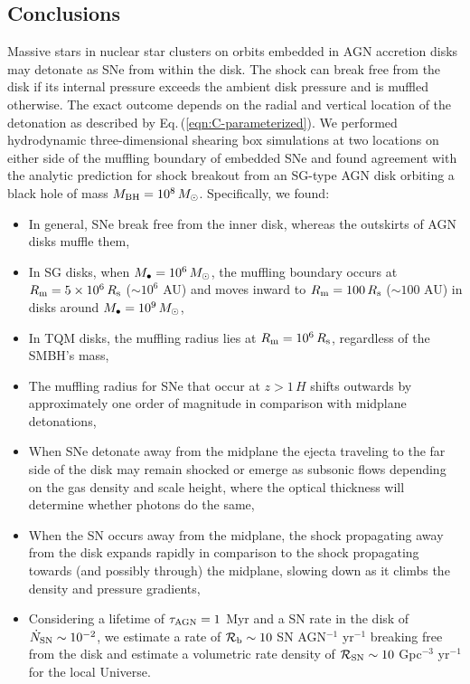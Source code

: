 
\subsection{Conclusions}
\label{sec:conclusions-snhydro}
Massive stars in nuclear star clusters on orbits embedded in AGN accretion disks may detonate as SNe from within the disk.
The shock can break free from the disk if its internal pressure exceeds the ambient disk pressure and is muffled otherwise.
The exact outcome depends on the radial and vertical location of the detonation as described by Eq.\,(\ref{eqn:C-parameterized}).
We performed hydrodynamic three-dimensional shearing box simulations at two locations on either side of the muffling boundary of embedded SNe and found agreement with the analytic prediction for shock breakout from an SG-type AGN disk orbiting a black hole of mass $M_{\rm BH}=10^8\,M_{\odot}$.
Specifically, we found:

\begin{itemize}
    \item In general, SNe break free from the inner disk, whereas the outskirts of AGN disks muffle them,
    \item In SG disks, when $M_\bullet=10^6\,M_{\odot}$, the muffling boundary occurs at $R_{\rm m}=5\times10^6\,R_{\rm s}$ ($\sim10^6$ AU) and moves inward to $R_{\rm m}=100\,R_{\rm s}$ ($\sim100$ AU) in disks around $M_\bullet=10^9\,M_{\odot}$,
    \item In TQM disks, the muffling radius lies at $R_{\rm m}=10^6\,R_{\rm s}$, regardless of the SMBH's mass,
    \item The muffling radius for SNe that occur at $z>1\,H$ shifts outwards by approximately one order of magnitude in comparison with midplane detonations,
    \item When SNe detonate away from the midplane the ejecta traveling to the far side of the disk may remain shocked or emerge as subsonic flows depending on the gas density and scale height, where the optical thickness will determine whether photons do the same,
    \item When the SN occurs away from the midplane, the shock propagating away from the disk expands rapidly in comparison to the shock propagating towards (and possibly through) the midplane, slowing down as it climbs the density and pressure gradients,
    \item Considering a lifetime of $\tau_{\rm AGN}=1$ Myr and a SN rate in the disk of $\dot{N}_{\rm SN} \sim 10^{-2}$, we estimate a rate of $\mathcal{R}_{\rm b} \sim 10$ SN AGN$^{-1}$ yr$^{-1}$ breaking free from the disk and estimate a volumetric rate density of $\mathcal{R}_{\rm SN} \sim 10$ Gpc$^{-3}$ yr$^{-1}$ for the local Universe.
\end{itemize}


